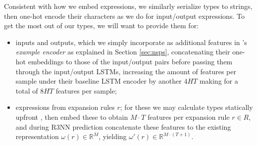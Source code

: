 \documentclass{article} %
\begin{document}
Consistent with how we embed expressions, we similarly serialize types to strings,
then one-hot encode their characters as we do for input/output expressions.
To get the most out of our types, we will want to provide them for:
\begin{itemize}
    \item inputs and outputs,
    which we simply incorporate as additional features in \citet{nsps}'s
    \emph{example encoder} as explained in Section \ref{sec:nsps},
    concatenating their one-hot embeddings to those of the input/output pairs before passing them through the input/output LSTMs,
    increasing the amount of features per sample under their baseline
    LSTM encoder by another $4HT$ making for a total of $8HT$ features per sample;

    \item expressions from expansion rules $r$; %
    for these we may calculate types statically upfront%
,
    then embed these to obtain $M \cdot T$ features per expansion rule $r \in R$,
    and during R3NN prediction concatenate these features to the existing
    representation $\omega(r) \in \mathbb{R}^M$,
    yielding $\omega'(r) \in \mathbb{R}^{M \cdot (T+1)}$.


\end{itemize}
\end{document}
